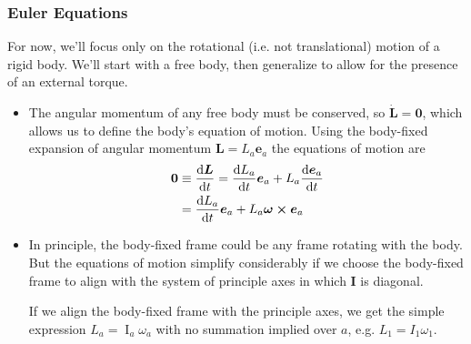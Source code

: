 \documentclass[11pt, a4paper]{article}
\newcommand{\e}{\bm{e}} %
\begin{document}
\subsubsection{Euler Equations}
For now, we'll focus only on the rotational (i.e. not translational) motion of a rigid body. We'll start with a free body, then generalize to allow for the presence of an external torque.
\begin{itemize}
	\item The angular momentum of any free body must be conserved, so $ \dot{\bm{L}} = \bm{0} $, which allows us to define the body's equation of motion. Using the body-fixed expansion of angular momentum $ \bm{L} = L_{a} \e_{a}  $ the equations of motion are
	\begin{align*}
		\bm{0} &\equiv \dv{\bm{L}}{t} = \dv{{L}_{a}}{t}\e_{a} + L_{a} \dv{{\e}_{a}}{t}  \\
		&= \dv{{L}_{a}}{t} \e_{a} + L_{a}\bm{\omega} \cross \e_{a}
	\end{align*}
	
	\item In principle, the body-fixed frame could be any frame rotating with the body. But the equations of motion simplify considerably if we choose the body-fixed frame to align with the system of principle axes in which $ \mathbf{I} $ is diagonal. 
	
	If we align the body-fixed frame with the principle axes, we get the simple expression $ L_{a} = \operatorname{I}_{a} \omega_{a} $ with no summation implied over $ a $, e.g. $ L_{1} = I_{1}\omega_{1} $.
	

\end{itemize}
\end{document}
